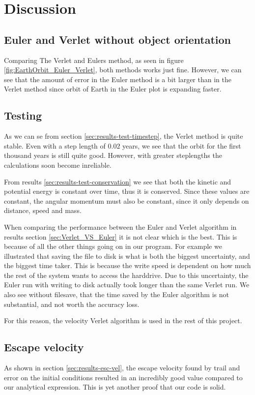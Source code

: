 \documentclass[../main.tex]{subfiles}
\begin{document}
\section{Discussion}\label{sec:discussion}

\subsection{Euler and Verlet without object orientation}
Comparing The Verlet and Eulers method, as seen in figure \ref{fig:EarthOrbit_Euler_Verlet}, both methods works just fine. However, we can see that the amount of error in the Euler method is a bit larger than in the Verlet method since orbit of Earth in the Euler plot is expanding faster.

\subsection{Testing}
As we can se from section \ref{sec:results-test-timestep}, the Verlet method is quite stable. Even with a step length of $0.02$ years, we see that the orbit for the first thousand years is still quite good. However, with greater steplengths the calculations soon become inreliable.

From results \ref{sec:results-test-conservation} we see that both the kinetic and potential energy is constant over time, thus it is conserved. Since these values are constant, the angular momentum must also be constant, since it only depends on distance, speed and mass.


When comparing the performance between the Euler and Verlet algorithm in results section \ref{sec:Verlet_VS_Euler} it is not clear which is the best. This is because of all the other things going on in our program. For example we illustrated that saving the file to disk is what is both the biggest uncertainty, and the biggest time taker. This is because the write speed is dependent on how much the rest of the system wants to access the harddrive. Due to this uncertainty, the Euler run with writing to disk actually took longer than the same Verlet run. We also see without filesave, that the time saved by the Euler algorithm is not substantial, and not worth the accuracy loss.

For this reason, the velocity Verlet algorithm is used in the rest of this project.

\subsection{Escape velocity}
As shown in section \ref{sec:results-esc-vel}, the escape velocity found by trail and error on the initial conditions resulted in an incredibly good value compared to our analytical expression. This is yet another proof that our code is solid.
\end{document}
